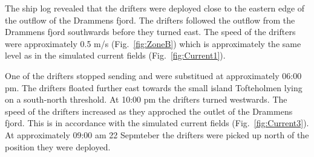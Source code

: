 \documentclass[12pt,a4paper,english]{article}
\begin{document}
The ship log revealed that the drifters were deployed close to the eastern edge of the outflow of the Drammens fjord. The drifters followed the outflow from the Drammens fjord southwards before they turned east. The speed of the drifters were approximately 0.5 m/s (Fig.~\ref{fig:ZoneB}) which is approximately the same level as in the simulated current fields (Fig.~\ref{fig:Current1}). 

One of the drifters stopped sending and were substitued at approximately 06:00 pm. The drifters floated further east towards the small island Tofteholmen lying on a south-north threshold. At 10:00 pm the drifters turned westwards. The speed of the drifters increased as they approched the outlet of the Drammens fjord. This is in accordance with the simulated current fields (Fig.~\ref{fig:Current3}). At approximately 09:00 am 22 Sepmteber the drifters were picked up north of the position they were deployed.

\end{document}
